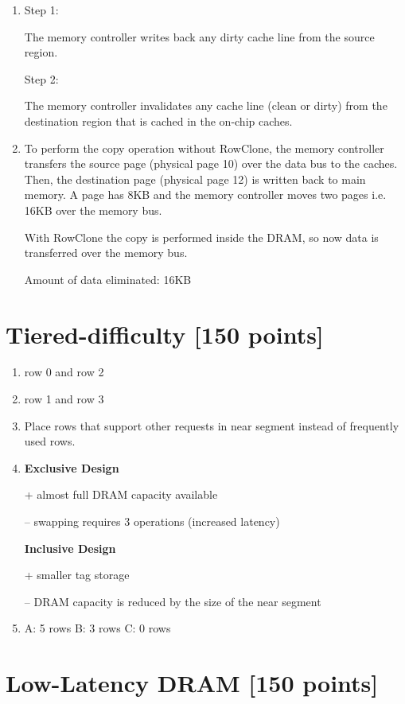 \documentclass[a4paper]{article}
\begin{document}
\begin{enumerate}[label=\alph*)]
    \item
        Step 1:

        The memory controller writes back any dirty cache line from
        the source region.

        Step 2:

        The memory controller invalidates any cache line (clean or
        dirty) from the destination region that is cached in the on-chip caches.

    \item To perform the copy operation without RowClone, the memory controller
        transfers the source page (physical page 10) over the data bus to the
        caches. Then, the destination page (physical page 12) is written back
        to main memory. A page has 8KB and the memory controller moves two
        pages i.e. 16KB over the memory bus.

        With RowClone the copy is performed inside the DRAM, so now data is
        transferred over the memory bus.

        Amount of data eliminated: 16KB
\end{enumerate}

\section{Tiered-difficulty [150 points]}

\begin{enumerate}[label=\alph*)]
    \item row 0 and row 2 
    \item row 1 and row 3
    \item Place rows that support other requests in near segment instead of frequently used rows.
    \item \textbf{Exclusive Design}

          + almost full DRAM capacity available

          -- swapping requires 3 operations (increased latency)

          \textbf{Inclusive Design}

          + smaller tag storage

          -- DRAM capacity is reduced by the size of the near segment
    \item A: 5 rows B: 3 rows C: 0 rows
\end{enumerate}

\section{Low-Latency DRAM [150 points]}
\end{document}
